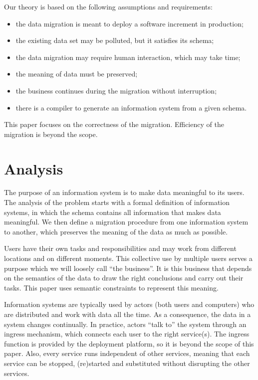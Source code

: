 \documentclass{elsarticle}
\begin{document}
   Our theory is based on the following assumptions and requirements:
\begin{itemize}
   \item the data migration is meant to deploy a software increment in production;
   \item the existing data set may be polluted, but it satisfies its schema;
   \item the data migration may require human interaction, which may take time;
   \item the meaning of data must be preserved;
   \item the business continues during the migration without interruption;
   \item there is a compiler to generate an information system from a given schema.
\end{itemize}
   This paper focuses on the correctness of the migration.
   Efficiency of the migration is beyond the scope.

\section{Analysis}
\label{sct:Analysis}
   The purpose of an information system is to make data meaningful to its users.
   The analysis of the problem starts with a formal definition of information systems,
   in which the schema contains all information that makes data meaningful.
   We then define a migration procedure from one information system to another,
   which preserves the meaning of the data as much as possible.

   Users have their own tasks and responsibilities
   and may work from different locations and on different moments.
   This collective use by multiple users serves a purpose which we will loosely call ``the business''.
   It is this business that depends on the semantics of the data to draw the right conclusions and carry out their tasks.
   This paper uses semantic constraints to represent this meaning.
   
   Information systems are typically used by actors (both users and computers) who are distributed and work with data all the time.
   As a consequence, the data in a system changes continually.
   In practice, actors ``talk to'' the system through an ingress mechanism, which connects each user to the right service(s).
   The ingress function is provided by the deployment platform, so it is beyond the scope of this paper.
   Also, every service runs independent of other services,
   meaning that each service can be stopped, (re)started and substituted without disrupting the other services.
\end{document}
